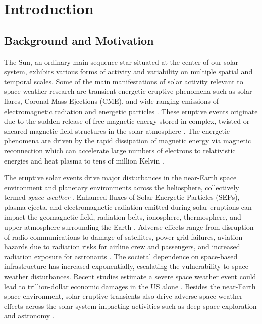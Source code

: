 \chapter{Introduction}
\label{chapter1}

\section{Background and Motivation}
The Sun, an ordinary main-sequence star situated at the center of our solar system, exhibits various forms of activity and variability on multiple spatial and temporal scales. Some of the main manifestations of solar activity relevant to space weather research are transient energetic eruptive phenomena such as solar flares, Coronal Mass Ejections (CME), and wide-ranging emissions of electromagnetic radiation and energetic particles \citep{schwenn_2006, pulkkinen_2007}. These eruptive events originate due to the sudden release of free magnetic energy stored in complex, twisted or sheared magnetic field structures in the solar atmosphere \citep{moore_2001, priest_forbes_2007, zhang_2012, amari_2014}. The energetic phenomena are driven by the rapid dissipation of magnetic energy via magnetic reconnection which can accelerate large numbers of electrons to relativistic energies and heat plasma to tens of million Kelvin \citep{shibata_2011, benz_2017}.

The eruptive solar events drive major disturbances in the near-Earth space environment and planetary environments across the heliosphere, collectively termed \textit{space weather} \citep{schrijver_2010, eastwood_2017}. Enhanced fluxes of Solar Energetic Particles (SEPs), plasma ejecta, and electromagnetic radiation emitted during solar eruptions can impact the geomagnetic field, radiation belts, ionosphere, thermosphere, and upper atmosphere surrounding the Earth \citep{schwenn_2006, pulkkinen_2007}. Adverse effects range from disruption of radio communications to damage of satellites, power grid failures, aviation hazards due to radiation risks for airline crew and passengers, and increased radiation exposure for astronauts \citep{lanzerotti_2001}. The societal dependence on space-based infrastructure has increased exponentially, escalating the vulnerability to space weather disturbances. Recent studies estimate a severe space weather event could lead to trillion-dollar economic damages in the US alone \citep{oughton_2017}. Besides the near-Earth space environment, solar eruptive transients also drive adverse space weather effects across the solar system impacting activities such as deep space exploration and astronomy \citep{lilensten_2014}.

